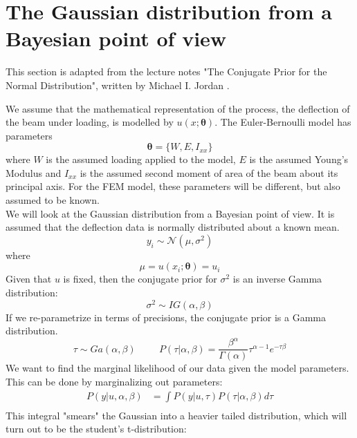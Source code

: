 \documentclass{article}
\begin{document}
\section{The Gaussian distribution from a Bayesian point of view}
\label{sec:headings}
This section is adapted from the lecture notes "The Conjugate Prior for the Normal Distribution", written by Michael I. Jordan \cite{Jordan}.

We assume that the mathematical representation of the process, the deflection of the beam under loading, is modelled by $u(x; \bm{\theta})$. The Euler-Bernoulli model has parameters
\begin{equation}
\boldsymbol\theta = \{W, E, I_{xx}\}
\end{equation}
where $W$ is the assumed loading applied to the model, $E$ is the assumed Young's Modulus and $I_{xx}$ is the assumed second moment of area of the beam about its principal axis. For the FEM model, these parameters will be different, but also assumed to be known.\\
We will look at the Gaussian distribution from a Bayesian point of view. It is assumed that the deflection data is normally distributed about a known mean.
\begin{equation}
y_i \sim \mathcal{N}(\mu,\sigma^{2})
\end{equation}
where
\begin{equation}
\mu = u(x_i;\boldsymbol{\theta}) =u_i
\end{equation}
Given that $u$ is fixed, then the conjugate prior for $\sigma^2$ is an inverse Gamma distribution:
\begin{equation}
\sigma^2 \sim IG(\alpha, \beta)
\end{equation}
If we re-parametrize in terms of precisions, the conjugate prior is a Gamma distribution.
\begin{equation}
\tau \sim Ga(\alpha, \beta)
\,\,\,\,\,\,\,\,\,\,\,\,\,\
P(\tau|\alpha,\beta)=\frac{\beta^\alpha}{\Gamma(\alpha)} \tau^{\alpha -1} e^{-\tau\beta}
\end{equation}
We want to find the marginal likelihood of our data given the model parameters. This can be done by marginalizing out parameters:
\begin{equation}
\begin{split}
P(y|u,\alpha,\beta) & =\int{P(y|u,\tau)P(\tau|\alpha,\beta)}d\tau\\
\end{split}
\end{equation}
This integral "smears" the Gaussian into a heavier tailed distribution, which will turn out to be the student's t-distribution:
\end{document}
